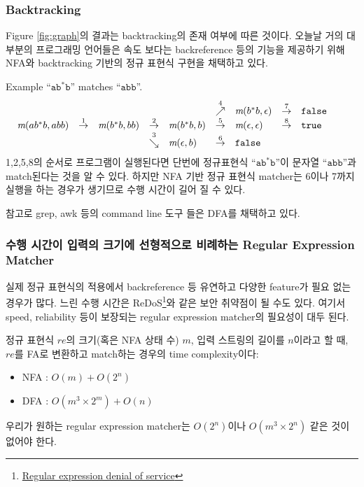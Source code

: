 \begin{frame}[shrink]
\frametitle{Backtracking}

Figure \ref{fig:graph}의 결과는 backtracking의 존재 여부에 따른 것이다.
오늘날 거의 대부분의 프로그래밍 언어들은 속도 보다는 backreference 등의 기능을 
제공하기 위해 NFA와 backtracking 기반의 정규 표현식 구현을 채택하고
있다.

\begin{block}{Example}
``$\texttt{ab}^{*}\texttt{b}$'' matches ``$\texttt{abb}$''.
\[
  \begin{array}{lllllllllll}
    &   &             &         &             &\stackrel{4}{\nearrow} &
    \rmatch{\e}{b^{*}b}&\stackrel{7}{\ra}& \F &  \\
    \rmatch{abb}{ab^{*}b} &\stackrel{1}{\ra}& \rmatch{bb}{b^{*}b} & \stackrel{2}{\ra}
    & \rmatch{b}{b^{*}b} &\stackrel{5}{\ra}     & \rmatch{\e}{\e}
    &\stackrel{8}{\ra}& \T &  \\
    &   &             & \stackrel{3}{\searrow} & \rmatch{b}{\e}
    &\stackrel{6}{\ra}     & \F  & &  & &   
  \end{array}
\]
1,2,5,8의 순서로 프로그램이 실행된다면 단번에 
정규표현식 ``$\texttt{ab}^{*}\texttt{b}$''이 문자열  ``$\texttt{abb}$''과
match된다는 것을 알 수 있다. 하지만 NFA 기반 정규 표현식 matcher는 6이나 
7까지 실행을 하는 경우가 생기므로 수행 시간이 길어 질 수 있다.
\end{block}

참고로 grep, awk 등의 command line 도구 들은 DFA를 채택하고 있다.

\end{frame}

\begin{frame}
\frametitle{수행 시간이 입력의 크기에 선형적으로 비례하는 Regular Expression Matcher}

실제 정규 표현식의 적용에서 backreference 등 유연하고 
다양한 feature가 필요 없는 경우가 많다. 
느린 수행 시간은 ReDoS\footnote{\href{http://en.wikipedia.org/wiki/ReDos}{Regular expression denial of service}}와 
같은 보안 취약점이 될 수도 있다.
여기서 speed, reliability 등이 보장되는 regular expression matcher의 
필요성이 대두 된다. 

정규 표현식 $re$의 크기(혹은 NFA 상태 수) $m$, 
입력 스트링의 길이를 $n$이라고 할 때, $re$를 FA로 변환하고 match하는 경우의
time complexity이다:

\begin{itemize}
\item NFA : $O(m) + O(2^n)$
\item DFA : $O(m^3 \times 2^m) + O(n)$
\end{itemize}

우리가 원하는 regular expression matcher는 $O(2^n)$이나 $O(m^3 \times 2^n)$ 같은 것이
없어야 한다.
\end{frame}
